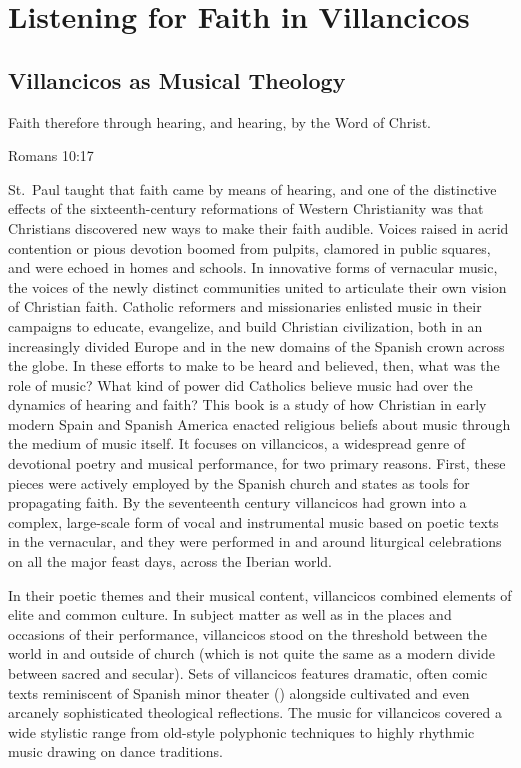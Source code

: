 %

\part{Listening for Faith in Villancicos}

\chapter{Villancicos as Musical Theology}

\label{ch:musical-theology}

\epigraph
{Faith therefore  through hearing, and hearing, by the Word of 
Christ.}
{Romans 10:17}

St.~Paul taught that faith came by means of hearing, and one of the distinctive 
effects of the sixteenth-century reformations of Western Christianity was that 
Christians discovered new ways to make their faith audible.
Voices raised in acrid contention or pious devotion boomed from pulpits, 
clamored in public squares, and were echoed in homes and schools.
In innovative forms of vernacular music, the voices of the newly distinct 
communities united to articulate their own vision of Christian faith.
Catholic reformers and missionaries enlisted music in their campaigns to 
educate, evangelize, and build Christian civilization, both in an increasingly 
divided Europe and in the new domains of the Spanish crown across the globe.
In these efforts to make  to be heard and believed, 
then, what was the role of music?
What kind of power did Catholics believe music had over the dynamics of hearing 
and faith?  
This book is a study of how Christian in early modern Spain and Spanish America 
enacted religious beliefs about music through the medium of music itself.
It focuses on villancicos, a widespread genre of devotional poetry and musical 
performance, for two primary reasons.
First, these pieces were actively employed by the Spanish church and states as 
tools for propagating faith.
By the seventeenth century villancicos had grown into a complex, large-scale 
form of vocal and instrumental music based on poetic texts in the vernacular, 
and they were performed in and around liturgical celebrations on all the major 
feast days, across the Iberian world.

In their poetic themes and their musical content, villancicos combined elements 
of elite and common culture.
In subject matter as well as in the places and occasions of their performance, 
villancicos stood on the threshold between the world in and outside of church 
(which is not quite the same as a modern divide between sacred and secular).
Sets of villancicos features dramatic, often comic texts reminiscent of Spanish 
minor theater () alongside cultivated and even arcanely 
sophisticated theological reflections.
The music for villancicos covered a wide stylistic range from old-style 
polyphonic techniques to highly rhythmic music drawing on dance traditions.


